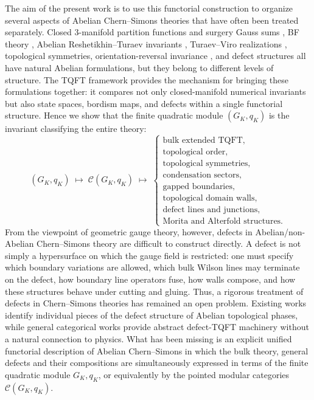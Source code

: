 \documentclass[12pt]{amsart}
\numberwithin{equation}{section}
\theoremstyle{definition}
\begin{document}
The aim of the present work is to use this functorial construction to organize several aspects of Abelian Chern--Simons theories that have often been treated separately.  Closed $3$-manifold partition functions and surgery Gauss sums \cite{Witten:1988,Murakami,Mattes,Deloup1999,Deloup2001,BelovMoore,Deloup2005,Stirling}, BF theory \cite{Horowitz89,BlauThompson91,BBRT91}, Abelian Reshetikhin--Turaev invariants \cite{Reshetikhin:1991,Turaev1994,Galviz3}, Turaev--Viro realizations \cite{TV92,BW96,BK2010}, topological symmetries, orientation-reversal invariance \cite{Delmas2021}, and defect structures \cite{LevinWen05,Kapustin2009,kapustin2010surface, Kapustin2010,kitaev2012models, BJQ2013} all have natural Abelian formulations, but they belong to different levels of structure.  The TQFT framework provides the mechanism for bringing these formulations together: it compares not only closed-manifold numerical invariants but also state spaces, bordism maps, and defects within a single functorial structure. Hence we show that the finite quadratic module $(G_K,q_K)$ is the invariant classifying the entire theory:
$$
(G_K,q_K)
\;\longmapsto\;
\mathcal C(G_K,q_K)
\;\longmapsto\;
\left\{
\begin{array}{l}
\text{bulk extended TQFT},\\[2pt]
\text{topological order},\\[2pt]
\text{topological symmetries},\\[2pt]
\text{condensation sectors},\\[2pt]
\text{gapped boundaries},\\[2pt]
\text{topological domain walls},\\[2pt]
\text{defect lines and junctions},\\[2pt]
\text{Morita and Alterfold structures}.
\end{array}
\right.
$$
From the viewpoint of geometric gauge theory, however, defects in Abelian/non-Abelian Chern--Simons theory are difficult to construct directly.  A defect is not simply a hypersurface on which the gauge field is restricted: one must specify which boundary variations are allowed, which bulk Wilson lines may terminate on the defect, how boundary line operators fuse, how walls compose, and how these structures behave under cutting and gluing. Thus, a rigorous treatment of defects in Chern--Simons theories has remained an open problem. Existing works identify individual pieces of the defect structure of Abelian topological phases, while general categorical works provide abstract defect-TQFT machinery without a natural connection to physics. What has been missing is an explicit unified functorial description of Abelian Chern--Simons in which the bulk theory, general defects and their compositions are simultaneously expressed in terms of the finite quadratic module $G_K,q_K$, or equivalently by the pointed modular categories $\mathcal C(G_K,q_K)$.
\end{document}
